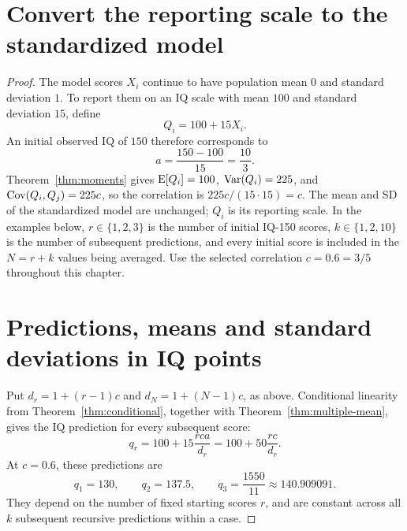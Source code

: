 \section{Convert the reporting scale to the standardized model}
\begin{proof}
The model scores \(X_i\) continue to have population mean \(0\) and
standard deviation \(1\). To report them on an IQ scale with mean \(100\)
and standard deviation \(15\), define
\begin{equation}
  Q_i=100+15X_i.
  \label{eq:iq-scale}
\end{equation}
An initial observed IQ of \(150\) therefore corresponds to
\begin{equation}
  a=\frac{150-100}{15}=\frac{10}{3}.
  \label{eq:iq150-start}
\end{equation}
Theorem~\ref{thm:moments} gives
\(\operatorname{E}[Q_i]=100\), \(\operatorname{Var}(Q_i)=225\), and
\(\operatorname{Cov}(Q_i,Q_j)=225c\), so the correlation is
\(225c/(15\cdot15)=c\). The mean and SD of the
standardized model are unchanged; \(Q_i\) is its reporting scale. In the
examples below, \(r\in\{1,2,3\}\) is the number of initial IQ-150 scores,
\(k\in\{1,2,10\}\) is the number of subsequent predictions, and every
initial score is included in the \(N=r+k\) values being averaged.
Use the selected correlation \(c=0.6=3/5\) throughout this chapter.

\section{Predictions, means and standard deviations in IQ points}
Put \(d_r=1+(r-1)c\) and \(d_N=1+(N-1)c\), as above. Conditional linearity
from Theorem~\ref{thm:conditional}, together with
Theorem~\ref{thm:multiple-mean}, gives the IQ prediction for every subsequent
score:
\begin{equation}
  q_r=100+15\frac{rca}{d_r}
      =100+50\frac{rc}{d_r}.
  \label{eq:iq150-prediction}
\end{equation}
At \(c=0.6\), these predictions are
\begin{equation}
  q_1=130,\qquad q_2=137.5,\qquad
  q_3=\frac{1550}{11}\approx140.909091.
  \label{eq:iq150-predictions}
\end{equation}
They depend on the number of fixed starting scores \(r\), and are constant
across all \(k\) subsequent recursive predictions within a case.


\end{proof}

